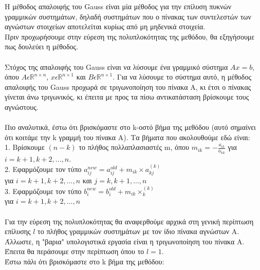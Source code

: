 \documentclass[12pt]{article}
\newcommand{\R}{\mathbb{R}}
\begin{document}
Η μέθοδος απαλοιφής του Gauss είναι μία μέθοδος για την επίλυση πυκνών γραμμικών συστημάτων, δηλαδή συστημάτων που ο πίνακας των συντελεστών των αγνώστων στοιχείων αποτελείται κυρίως από μη μηδενικά στοιχεία. \\
Πριν προχωρήσουμε στην εύρεση της πολυπλοκότητας της μεθόδου, θα εξηγήσουμε πως δουλεύει η μέθοδος. \\ \\
Στόχος της απαλοιφής του Gauss είναι να λύσουμε ένα γραμμικό σύστημα $Ax = b$, όπου $A\epsilon \R^{n\times n}$, $x\epsilon \R^{n\times 1}$ και $B\epsilon \R^{n\times 1}$. Για να λύσουμε το σύστημα αυτό, η μέθοδος απαλοιφής του Gauss προχωρά σε τριγωνοποίηση του πίνακα A, κι έτσι ο πίνακας γίνεται άνω τριγωνικός, κι έπειτα με προς τα πίσω αντικατάσταση βρίσκουμε τους αγνώστους. \\ \\
Πιο αναλυτικά, έστω ότι βρισκόμαστε στο k-οστό βήμα της μεθόδου (αυτό σημαίνει ότι κοιτάμε την k γραμμή του πίνακα A). Τα βήματα που ακολουθούμε εδώ είναι: \\
1. Βρίσκουμε $(n-k)$ το πλήθος πολλαπλασιαστές m, όπου $m_{ik} = - \frac{a_{ik}}{a_{kk}}$ για $i=k+1,k+2,...,n$. \\
2. Εφαρμόζουμε τον τύπο $a_{ij}^{new} = a_{ij}^{old} + m_{ik}\times a_{kj}^{(k)}$ \\ για $i = k+1, k+2, ...,n$ και $j = k, k+1,...,n$ \\
3. Εφαρμόζουμε τον τύπο $b_{i}^{new} = b_{i}^{old} + m_{ik}\times _{k}^{(k)}$ \\ για $i = k+1, k+2, ...,n$ \\ \\
Για την εύρεση της πολυπλοκότητας θα αναφερθούμε αρχικά στη γενική περίπτωση επίλυσης $l$ το πλήθος γραμμικών συστημάτων με τον ίδιο πίνακα αγνώστων Α. Άλλωστε, η "βαρια" υπολογιστικά εργασία είναι η τριγωνοποίηση του πίνακα Α. Έπειτα θα περάσουμε στην περίπτωση όπου το $l=1$. \\
Έστω πάλι ότι βρισκόμαστε στο k βήμα της μεθόδου:
\end{document}
